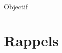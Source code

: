 \documentclass[style=heg]{powerdot}
\title{}
\author{Dr. Sacha Varone}
\date{}
\begin{document}
\maketitle

\begin{slide}[toc=]{Objectif}
\end{slide}

\section{Rappels}
\begin{slide}[toc=]{}
\end{slide}

\section{}
\begin{slide}[toc=]{}
\end{slide}

\begin{slide}[toc=]{}
\end{slide}

\begin{slide}[toc=]{}
\end{slide}
\end{document}
